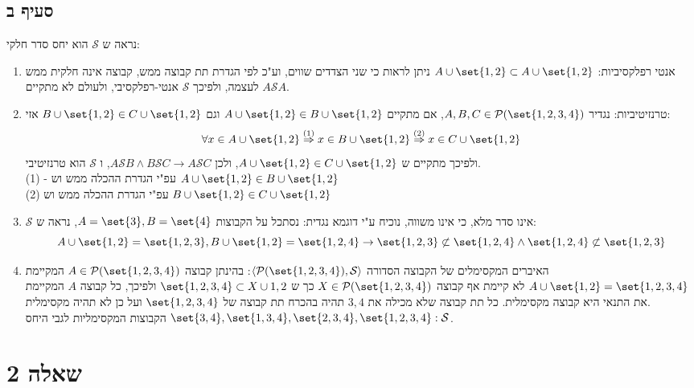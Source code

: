 \documentclass{article}
\DeclarePairedDelimiter\set\{\}
\begin{document}
	\subsection*{סעיף ב}
נראה ש $\mathcal{S}$ הוא יחס סדר חלקי:
\begin{enumerate}
	\item אנטי רפלקסיביות:
	$A \cup \set{1,2} \subset A \cup \set{1,2}$
	ניתן לראות כי שני הצדדים שווים, וע"כ לפי הגדרת תת קבוצה ממש, קבוצה אינה חלקית ממש לעצמה,
	ולפיכך $\mathcal{S}$ אנטי-רפלקסיבי, ולעולם לא מתקיים $A\mathcal{S}A$.
	\item טרנזיטיביות:
	נגדיר $A,B,C \in \PP(\set{1,2,3,4})$,
	אם מתקיים $A \cup \set{1,2} \in B \cup \set{1,2}$
	וגם $B \cup \set{1,2} \in C \cup \set{1,2}$ אזי:
\[
	\forall x \in A \cup \set{1,2} \ontop{(1)}\Rightarrow
	x \in B \cup \set{1,2} \ontop{(2)}\Rightarrow
	x \in C \cup \set{1,2}
\]
ולפיכך מתקיים ש $A \cup \set{1,2} \in C \cup \set{1,2}$, ולכן
$A \mathcal{S} B \land B \mathcal{S} C \to A \mathcal{S} C$, ו $\mathcal{S}$ הוא טרנזיטיבי. \\
(1) -
עפ"י הגדרת ההכלה ממש וש $A \cup \set{1,2} \in B \cup \set{1,2}$ \\
(2) עפ"י הגדרת ההכלה ממש וש $B \cup \set{1,2} \in C \cup \set{1,2}$ \\
	\item $\mathcal{S}$ אינו סדר מלא, כי אינו משווה, נוכיח ע"י דוגמא נגדית:
	נסתכל על הקבוצות $A = \set{3}, B = \set{4}$, נראה ש:
	\[
		A \cup \set{1,2} = \set{1,2,3},  B \cup \set{1,2} = \set{1,2,4} \to \set{1,2,3} \not \subset \set{1,2,4} \land \set{1,2,4} \not \subset \set{1,2,3}
	\]
	\item האיברים המקסימלים של הקבוצה הסדורה $\langle \PP(\set{1,2,3,4}), \mathcal{S} \rangle$:
בהינתן קבוצה $A \in \PP(\set{1,2,3,4})$ המקיימת $A \cup \set{1,2} = \set{1,2,3,4}$
לא קיימת אף קבוצה $X \in \PP(\set{1,2,3,4})$ כך ש $\set{1,2,3,4} \subset X \cup{1,2}$
ולפיכך, כל קבוצה $A$ המקיימת את התנאי היא קבוצה מקסימלית.
כל תת קבוצה שלא מכילה את $3,4$  תהיה בהכרח תת קבוצה של $\set{1,2,3,4}$ ועל כן לא תהיה מקסימלית. \\
הקבוצות המקסימליות לגבי היחס $\set{3,4}, \set{1,3,4}, \set{2,3,4}, \set{1,2,3,4} :\mathcal{S}$.
\end{enumerate}

	\pagebreak
	\section*{שאלה 2}
\end{document}
